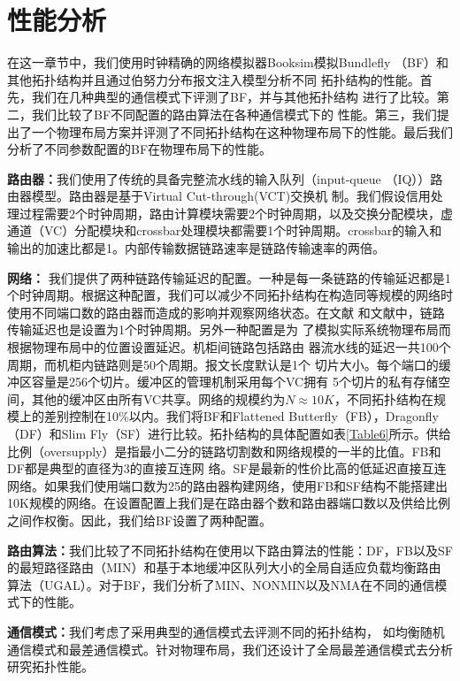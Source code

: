 \section{性能分析}
在这一章节中，我们使用时钟精确的网络模拟器Booksim模拟Bundlefly （BF）和其他拓扑结构并且通过伯努力分布报文注入模型分析不同
拓扑结构的性能。首先，我们在几种典型的通信模式下评测了BF，并与其他拓扑结构
进行了比较。第二，我们比较了BF不同配置的路由算法在各种通信模式下的
性能。第三，我们提出了一个物理布局方案并评测了不同拓扑结构在这种物理布局下的性能。最后我们分析了不同参数配置的BF在物理布局下的性能。

\textbf{路由器：}我们使用了传统的具备完整流水线的输入队列（input-queue （IQ））路由器模型。路由器是基于Virtual Cut-through(VCT)交换机
制。我们假设信用处理过程需要2个时钟周期，路由计算模块需要2个时钟周期，以及交换分配模块，虚通道（VC）分配模块和crossbar处理模块都需要1个时钟周期。crossbar的输入和输出的加速比都是1。内部传输数据链路速率是链路传输速率的两倍。

\textbf{网络：} 我们提供了两种链路传输延迟的配置。一种是每一条链路的传输延迟都是1个时钟周期。根据这种配置，我们可以减少不同拓扑结构在构造同等规模的网络时使用不同端口数的路由器而造成的影响并观察网络状态。在文献
和文献中，链路传输延迟也是设置为1个时钟周期。另外一种配置是为
了模拟实际系统物理布局而根据物理布局中的位置设置延迟。机柜间链路包括路由
器流水线的延迟一共100个周期，而机柜内链路则是50个周期。报文长度默认是1个
切片大小。每个端口的缓冲区容量是256个切片。缓冲区的管理机制采用每个VC拥有
5个切片的私有存储空间，其他的缓冲区由所有VC共享。网络的规模约为$N\approx10K$，不同拓扑结构在规模上的差别控制在10\%以内。我们将BF和Flattened Butterfly（FB），Dragonfly（DF）和Slim Fly（SF）进行比较。拓扑结构的具体配置如表\ref{Table6}所示。供给比例（oversupply）是指最小二分的链路切割数和网络规模的一半的比值。FB和DF都是典型的直径为3的直接互连网
络。SF是最新的性价比高的低延迟直接互连网络。如果我们使用端口数为25的路由器构建网络，使用FB和SF结构不能搭建出10K规模的网络。在设置配置上我们是在路由器个数和路由器端口数以及供给比例之间作权衡。因此，我们给BF设置了两种配置。

\textbf{路由算法：}我们比较了不同拓扑结构在使用以下路由算法的性能：DF，FB以及SF 的最短路径路由（MIN）和基于本地缓冲区队列大小的全局自适应负载均衡路由算法（UGAL）。对于BF，我们分析了MIN、NONMIN以及NMA在不同的通信模式下的性能。

\textbf{通信模式：}我们考虑了采用典型的通信模式去评测不同的拓扑结构，
如均衡随机通信模式和最差通信模式。针对物理布局，我们还设计了全局最差通信模式去分析研究拓扑性能。

